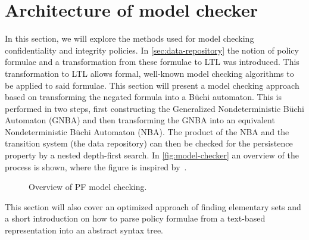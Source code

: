 \section{Architecture of model checker}\label{sec:methods}
In this section, we will explore the methods used for model checking confidentiality and integrity policies. In \autoref{sec:data-repository} the notion of policy formulae and a transformation from these formulae to LTL was introduced. This transformation to LTL allows formal, well-known model checking algorithms to be applied to said formulae. This section will present a model checking approach based on transforming the negated formula into a Büchi automaton. This is performed in two steps, first constructing the Generalized Nondeterministic Büchi Automaton (GNBA) and then transforming the GNBA into an equivalent Nondeterministic Büchi Automaton (NBA). The product of the NBA and the transition system (the data repository) can then be checked for the persistence property by a nested depth-first search. In \autoref{fig:model-checker} an overview of the process is shown, where the figure is inspired by~\cite[Fig.~5.16]{baier2008principles}.

\begin{figure}[!ht]
    \centering
    
    \caption{Overview of PF model checking.}
    \label{fig:model-checker}
\end{figure}

This section will also cover an optimized approach of finding elementary sets and a short introduction on how to parse policy formulae from a text-based representation into an abstract syntax tree.

